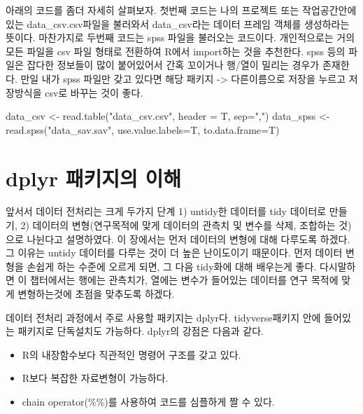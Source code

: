 \documentclass[
]{book}
\newenvironment{Shaded}{\begin{snugshade}}{\end{snugshade}}
\newcommand{\AttributeTok}[1]{\textcolor[rgb]{0.77,0.63,0.00}{#1}}
\newcommand{\FunctionTok}[1]{\textcolor[rgb]{0.00,0.00,0.00}{#1}}
\newcommand{\NormalTok}[1]{#1}
\newcommand{\OtherTok}[1]{\textcolor[rgb]{0.56,0.35,0.01}{#1}}
\newcommand{\StringTok}[1]{\textcolor[rgb]{0.31,0.60,0.02}{#1}}
\providecommand{\tightlist}{%
  \setlength{\itemsep}{0pt}\setlength{\parskip}{0pt}}
\theoremstyle{definition}
\theoremstyle{definition}
\theoremstyle{definition}
\theoremstyle{definition}
\theoremstyle{remark}
\begin{document}
아래의 코드를 좀더 자세히 살펴보자. 첫번째 코드는 나의 프로젝트 또는 작업공간안에 있는 data\_csv.csv파일을 불러와서 data\_csv라는 데이터 프레임 객체를 생성하라는 뜻이다. 마찬가지로 두번째 코드는 spss 파일을 불러오는 코드이다.
개인적으로는 거의 모든 파일을 csv 파일 형태로 전환하여 R에서 import하는 것을 추천한다. spss 등의 파일은 잡다한 정보들이 많이 붙어있어서 간혹 꼬이거나 행/열이 밀리는 경우가 존재한다. 만일 내가 spss 파일만 갖고 있다면 해당 패키지 -\textgreater{} 다른이름으로 저장을 누르고 저장방식을 csv로 바꾸는 것이 좋다.

\begin{Shaded}
\begin{Highlighting}[]
\NormalTok{data\_csv }\OtherTok{\textless{}{-}} \FunctionTok{read.table}\NormalTok{(}\StringTok{"data\_csv.csv"}\NormalTok{, }\AttributeTok{header =}\NormalTok{ T, }\AttributeTok{sep=}\StringTok{","}\NormalTok{) }
\NormalTok{data\_spss }\OtherTok{\textless{}{-}} \FunctionTok{read.spss}\NormalTok{(}\StringTok{"data\_sav.sav"}\NormalTok{, }\AttributeTok{use.value.labels=}\NormalTok{T, }\AttributeTok{to.data.frame=}\NormalTok{T)}
\end{Highlighting}
\end{Shaded}

\hypertarget{dplyr-uxd328uxd0a4uxc9c0uxc758-uxc774uxd574}{%
\section{dplyr 패키지의 이해}\label{dplyr-uxd328uxd0a4uxc9c0uxc758-uxc774uxd574}}

앞서서 데이터 전처리는 크게 두가지 단계 1) untidy한 데이터를 tidy 데이터로 만들기, 2) 데이터의 변형(연구목적에 맞게 데이터의 관측치 및 변수를 삭제, 조합하는 것)으로 나뉜다고 설명하였다. 이 장에서는 먼저 데이터의 변형에 대해 다루도록 하겠다. 그 이유는 untidy 데이터를 다루는 것이 더 높은 난이도이기 때문이다. 먼저 데이터 변형을 손쉽게 하는 수준에 오르게 되면, 그 다음 tidy화에 대해 배우는게 좋다. 다시말하면 이 챕터에서는 행에는 관측치가, 열에는 변수가 들어있는 데이터를 연구 목적에 맞게 변형하는것에 초점을 맞추도록 하겠다.

데이터 전처리 과정에서 주로 사용할 패키지는 dplyr다. tidyverse패키지 안에 들어있는 패키지로 단독설치도 가능하다. dplyr의 강점은 다음과 같다.

\begin{itemize}
\tightlist
\item
  R의 내장함수보다 직관적인 명령어 구조를 갖고 있다.
\item
  R보다 복잡한 자료변형이 가능하다.
\item
  chain operator(\%\%)를 사용하여 코드를 심플하게 짤 수 있다.
\end{itemize}
\end{document}
